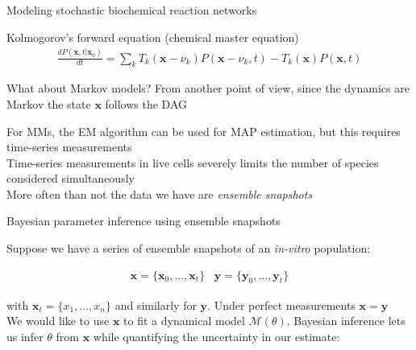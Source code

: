 \documentclass[aspectratio=1610]{beamer}					%
\begin{document}
\begin{section}{Modeling stochastic biochemical reaction networks}
\begin{frame}{Kolmogorov's forward equation (chemical master equation)}
\begin{align*}
\frac{dP(\mathbf{x},t|\mathbf{x}_{0})}{dt} = \sum_{k} T_{k}(\mathbf{x}-\nu_{k})P(\mathbf{x}-\nu_{k},t) - T_{k}(\mathbf{x})P(\mathbf{x},t)
\end{align*}

\end{frame}

\begin{frame}{What about Markov models?}
From another point of view, since the dynamics are Markov the state $\mathbf{x}$ follows the DAG
\vspace{0.2in}

\begin{center}
\end{center}

For MMs, the EM algorithm can be used for MAP estimation, but this requires time-series measurements\\
\vspace{0.1in}
Time-series measurements in live cells severely limits the number of species considered simultaneously\\
\vspace{0.1in}
More often than not the data we have are \emph{ensemble snapshots}

\end{frame}

\begin{frame}{Bayesian parameter inference using ensemble snapshots}

Suppose we have a series of ensemble snapshots of an \emph{in-vitro} population:

\begin{align*}
\mathbf{x} = \{\mathbf{x}_{0}, ..., \mathbf{x}_{t}\}\;\;\; \mathbf{y} = \{\mathbf{y}_{0}, ..., \mathbf{y}_{t}\}
\end{align*}

with $\mathbf{x}_{t} = \{x_{1}, ..., x_{n}\}$ and similarly for $\mathbf{y}$. Under perfect measurements $\mathbf{x}=\mathbf{y}$\\
\vspace{0.2in}
We would like to use $\mathbf{x}$ to fit a dynamical model $\mathcal{M}(\theta)$. Bayesian inference lets us infer $\theta$ from $\mathbf{x}$ while quantifying the uncertainty in our estimate:


\end{frame}
\end{section}
\end{document}

